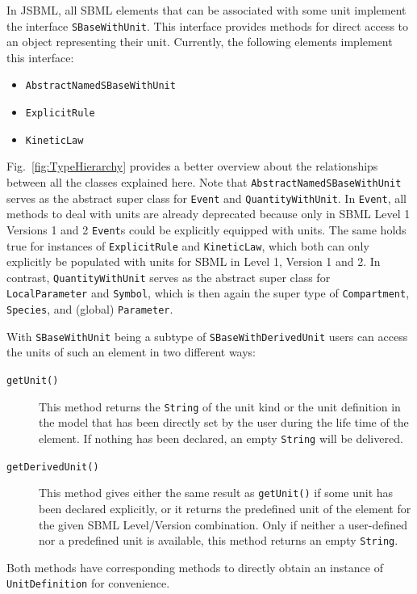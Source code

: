 \documentclass[
  BCOR12mm,
  letterpaper,
  11pt,
  headsepline,
  pointlessnumbers,
  tablecaptionabove,
  onelinecaption,
  headinclude,
  appendixprefix,
  idxtotoc,
  bibtotoc,
  twoside,
  titlepage
]{scrartcl}
\begin{document}
In JSBML, all SBML elements that can be associated with some unit implement the
interface \texttt{SBaseWithUnit}. This interface provides methods for direct
access to an object representing their unit. Currently, the following elements
implement this interface:
\begin{itemize}
 \item \texttt{AbstractNamedSBaseWithUnit}
 \item \texttt{ExplicitRule}
 \item \texttt{KineticLaw}
\end{itemize}
Fig.~\vref{fig:TypeHierarchy} provides a better overview about the relationships
between all the classes explained here. Note that
\texttt{AbstractNamedSBaseWithUnit} serves as the abstract super class for
\texttt{Event} and \texttt{QuantityWithUnit}. In \texttt{Event}, all methods
to deal with units are already deprecated because only in SBML Level 1 Versions 1
and 2 \citep{Hucka2003} \texttt{Event}s could be explicitly equipped with units.
The same holds true for instances of \texttt{ExplicitRule}
and \texttt{KineticLaw},
which both can only explicitly be populated with units for
SBML in Level 1, Version 1 and 2. In contrast, \texttt{QuantityWithUnit} serves
as the abstract super class for \texttt{LocalParameter} and \texttt{Symbol},
which is then again the super type of \texttt{Compartment}, \texttt{Species}, and (global) \texttt{Parameter}.

With \texttt{SBaseWithUnit} being a subtype of \texttt{SBaseWithDerivedUnit}
users can access the units of such an element in two different ways:
\begin{description}
 \item[\texttt{getUnit()}] This method returns the \texttt{String} of the unit
 kind or the unit definition in the model
 that has been directly set by the user
 during the life time of the element. If nothing has been declared, an empty
 \texttt{String} will be delivered.
 \item[\texttt{getDerivedUnit()}] This method gives either the same result as
 \texttt{getUnit()} if some unit has been declared explicitly, or it returns the
 predefined unit of the element for the given SBML Level/Version combination.
 Only if neither a user-defined nor a predefined unit is available, this method
 returns an empty \texttt{String}.
\end{description}
Both methods have corresponding methods to directly obtain an instance of
\texttt{UnitDefinition}
for convenience.
\end{document}
